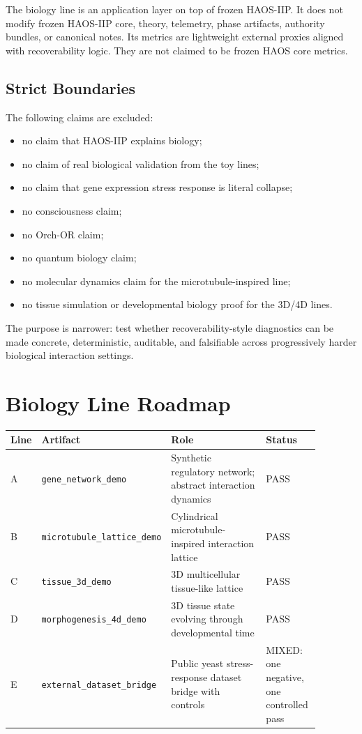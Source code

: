 \documentclass[11pt]{article}
\begin{document}
The biology line is an application layer on top of frozen HAOS-IIP. It does not modify frozen HAOS-IIP core, theory, telemetry, phase artifacts, authority bundles, or canonical notes. Its metrics are lightweight external proxies aligned with recoverability logic. They are not claimed to be frozen HAOS core metrics.

\subsection{Strict Boundaries}

The following claims are excluded:

\begin{itemize}
\item no claim that HAOS-IIP explains biology;
\item no claim of real biological validation from the toy lines;
\item no claim that gene expression stress response is literal collapse;
\item no consciousness claim;
\item no Orch-OR claim;
\item no quantum biology claim;
\item no molecular dynamics claim for the microtubule-inspired line;
\item no tissue simulation or developmental biology proof for the 3D/4D lines.
\end{itemize}

The purpose is narrower: test whether recoverability-style diagnostics can be made concrete, deterministic, auditable, and falsifiable across progressively harder biological interaction settings.

\section{Biology Line Roadmap}

\begin{longtable}{p{0.08\linewidth}p{0.24\linewidth}p{0.38\linewidth}p{0.18\linewidth}}
\toprule
Line & Artifact & Role & Status \\
\midrule
A & \texttt{gene\_network\_demo} & Synthetic regulatory network; abstract interaction dynamics & PASS \\
B & \texttt{microtubule\_lattice\_demo} & Cylindrical microtubule-inspired interaction lattice & PASS \\
C & \texttt{tissue\_3d\_demo} & 3D multicellular tissue-like lattice & PASS \\
D & \texttt{morphogenesis\_4d\_demo} & 3D tissue state evolving through developmental time & PASS \\
E & \texttt{external\_dataset\_bridge} & Public yeast stress-response dataset bridge with controls & MIXED: one negative, one controlled pass \\
\bottomrule
\end{longtable}
\end{document}
